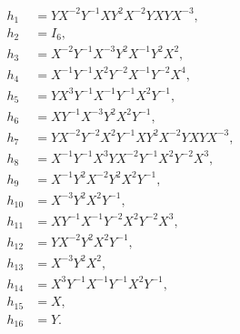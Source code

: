 \begin{align*}
h_{1} &= Y X^{-2} Y^{-1} X Y^{2} X^{-2} Y X Y X^{-3},\\
h_{2} &= I_6,\\
h_{3} &= X^{-2} Y^{-1} X^{-3} Y^{2} X^{-1} Y^{2} X^{2},\\
h_{4} &= X^{-1} Y^{-1} X^{2} Y^{-2} X^{-1} Y^{-2} X^{4},\\
h_{5} &= Y X^{3} Y^{-1} X^{-1} Y^{-1} X^{2} Y^{-1},\\
h_{6} &= X Y^{-1} X^{-3} Y^{2} X^{2} Y^{-1},\\
h_{7} &= Y X^{-2} Y^{-2} X^{2} Y^{-1} X Y^{2} X^{-2} Y X Y X^{-3},\\
h_{8} &= X^{-1} Y^{-1} X^{3} Y X^{-2} Y^{-1} X^{2} Y^{-2} X^{3},\\
h_{9} &= X^{-1} Y^{2} X^{-2} Y^{2} X^{2} Y^{-1},\\
h_{10} &= X^{-3} Y^{2} X^{2} Y^{-1},\\
h_{11} &= X Y^{-1} X^{-1} Y^{-2} X^{2} Y^{-2} X^{3},\\
h_{12} &= Y X^{-2} Y^{2} X^{2} Y^{-1},\\
h_{13} &= X^{-3} Y^{2} X^{2},\\
h_{14} &= X^{3} Y^{-1} X^{-1} Y^{-1} X^{2} Y^{-1},\\
h_{15} &= X,\\
h_{16} &= Y.\\
\end{align*}
